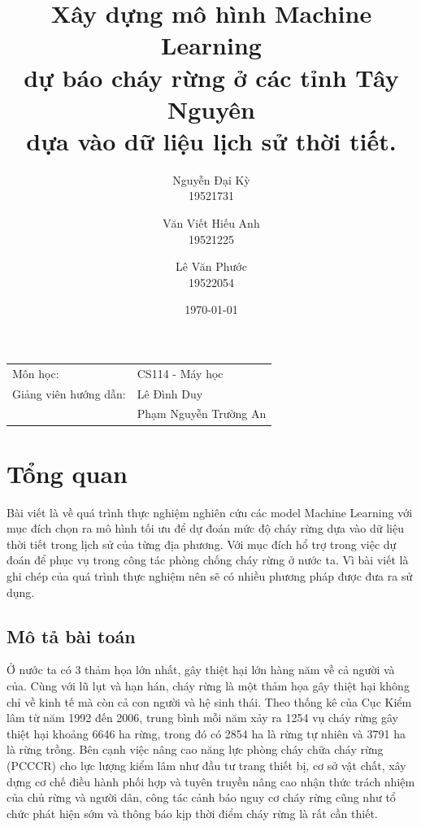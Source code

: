 \documentclass{article}
\begin{document}
\title{
	\LARGE{
		\textbf{
			Xây dựng mô hình Machine Learning \\ dự báo cháy rừng ở các tỉnh Tây Nguyên \\ dựa vào dữ liệu lịch sử thời tiết.
		}
	}
}

\author{
	Nguyễn Đại Kỳ\\
	19521731\\
	\and
	Văn Viết Hiếu Anh\\
	19521225
	\and
	Lê Văn Phước\\
	19522054
}

\date{\today} %
\maketitle %
\begin{center}
	\begin{tabular}{l l}
		Môn học:              & CS114 - Máy học       \\
		Giảng viên hướng dẫn: & Lê Đình Duy           \\
		                      & Phạm Nguyễn Trường An \\
	\end{tabular}
\end{center}

\tableofcontents

\pagebreak


\section{Tổng quan}
\qquad Bài viết là về quá trình thực nghiệm nghiên cứu các model Machine Learning với mục đích chọn ra mô hình tối ưu để dự đoán mức độ cháy rừng dựa vào dữ liệu thời tiết trong lịch sử của từng địa phương. Với mục đích hổ trợ trong việc dự đoán để phục vụ trong công tác phòng chống cháy rừng ở nước ta. Vì bài viết là ghi chép của quá trình thực nghiệm nên sẽ có nhiều phương pháp được đưa ra sử dụng.

\subsection{Mô tả bài toán}
\qquad Ở nước ta có 3 thảm họa lớn nhất, gây thiệt hại lớn hàng năm về cả người và của. Cùng với lũ lụt và hạn hán, cháy rừng là một thảm họa gây thiệt hại không chỉ về kinh tế mà còn cả con người và hệ sinh thái. Theo thống kê của Cục Kiểm lâm từ năm 1992 đến 2006, trung bình mỗi năm xảy ra 1254 vụ cháy rừng gây thiệt hại khoảng 6646 ha rừng, trong đó có 2854 ha là rừng tự nhiên và 3791 ha là rừng trồng. Bên cạnh việc nâng cao năng lực phòng cháy chữa cháy rừng (PCCCR) cho lực lượng kiểm lâm như đầu tư trang thiết bị, cơ sở vật chất, xây dựng cơ chế điều hành phối hợp và tuyên truyền nâng cao nhận thức trách nhiệm của chủ rừng và người dân, công tác cảnh báo nguy cơ cháy rừng cũng như tổ chức phát hiện sớm và thông báo kịp thời điểm cháy rừng là rất cần thiết.
\end{document}
